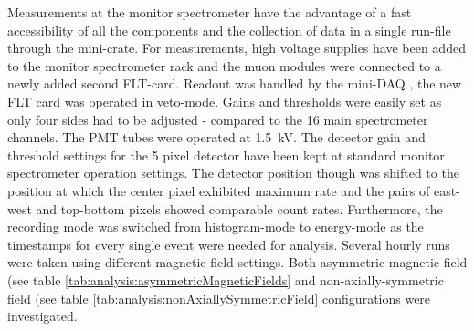   Measurements at the monitor spectrometer have the advantage of a fast accessibility of all the components and the collection of data in a single run-file through the mini-crate.
  For measurements, high voltage supplies have been added to the monitor spectrometer rack and the muon modules were connected to a newly added second FLT-card. Readout was handled by the mini-DAQ , the new FLT card was operated in veto-mode. Gains and thresholds were easily set as only four sides had to be adjusted - compared to the 16 main spectrometer channels. The PMT tubes were operated at \SI{1.5}{\kilo\volt}. The detector gain and threshold settings for the 5 pixel detector have been kept at standard monitor spectrometer operation settings. The detector position though was shifted to the position at which the center pixel exhibited maximum rate and the pairs of east-west and top-bottom pixels showed comparable count rates. Furthermore, the recording mode was switched from histogram-mode to energy-mode as the timestamps for every single event were needed for analysis. 
  Several hourly runs were taken using different magnetic field settings. Both asymmetric magnetic field (see table \ref{tab:analysis:asymmetricMagneticFields} and non-axially-symmetric field (see table \ref{tab:analysis:nonAxiallySymmetricField} configurations were investigated.
